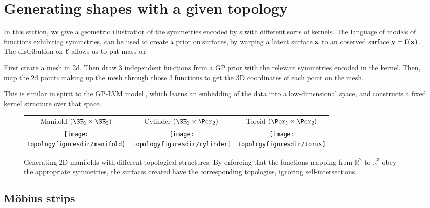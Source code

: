 \section{Generating shapes with a given topology}

In this section, we give a geometric illustration of the symmetries encoded by \gp{}s with different sorts of kernels.
The language of models of functions exhibiting symmetries, can be used to create a prior on surfaces, by warping a latent surface ${\bf{x}}$ to an observed surface ${\bf{y}} = {\bf{f}}({\bf{x}})$.
The distribution on ${\bf{f}}$ allows us to put mass on 

First create a mesh in 2d.  Then draw 3 independent functions from a GP prior with the relevant symmetries encoded in the kernel.  Then, map the 2d points making up the mesh through those 3 functions to get the 3D  coordinates of each point on the mesh.

This is similar in spirit to the GP-LVM model \cite{lawrence2005probabilistic}, which learns an embedding of the data into a low-dimensional space, and constructs a fixed kernel structure over that space.


\begin{figure}
\begin{tabular}{ccc}
Manifold $( \SE_1 \times \SE_2 )$  & Cylinder $( \SE_1 \times \Per_2 )$ & Toroid $( \Per_1 \times \Per_2 )$\\
\texttt{[image: \\topologyfiguresdir/manifold]} &
\texttt{[image: \\topologyfiguresdir/cylinder]} &
\texttt{[image: \\topologyfiguresdir/torus]} \\
\end{tabular}
\caption[Generating 2D manifolds with different topological structures]{Generating 2D manifolds with different topological structures.  By enforcing that the functions mapping from $\mathbb{R}^2$ to $\mathbb{R}^3$ obey the appropriate symmetries, the surfaces created have the corresponding topologies, ignoring self-intersections.}
\label{fig:gen_surf}
\end{figure}



\subsection{M\"{o}bius strips}

